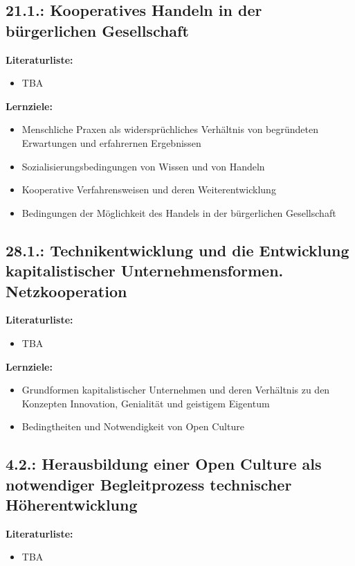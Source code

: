 \documentclass[11pt,a4paper]{article}
\begin{document}
\subsection{21.1.: Kooperatives Handeln in der bürgerlichen Gesellschaft}

\textbf{Literaturliste:}
\begin{itemize}
\item TBA
\end{itemize}

\textbf{Lernziele:}
\begin{itemize}[noitemsep]
\item Menschliche Praxen als widersprüchliches Verhältnis von begründeten
  Erwartungen und erfahrernen Ergebnissen
\item Sozialisierungsbedingungen von Wissen und von Handeln
\item Kooperative Verfahrensweisen und deren Weiterentwicklung
\item Bedingungen der Möglichkeit des Handels in der bürgerlichen Gesellschaft 
\end{itemize}

\subsection{28.1.: Technikentwicklung und die Entwicklung kapitalistischer
  Unternehmensformen. Netzkooperation} 

\textbf{Literaturliste:}
\begin{itemize}
\item TBA
\end{itemize}

\textbf{Lernziele:}
\begin{itemize}[noitemsep]
\item Grundformen kapitalistischer Unternehmen und deren Verhältnis zu den
  Konzepten Innovation, Genialität und geistigem Eigentum
\item Bedingtheiten und Notwendigkeit von Open Culture
\end{itemize}

\subsection{4.2.: Herausbildung einer Open Culture als notwendiger
  Begleitprozess technischer Höherentwicklung} 

\textbf{Literaturliste:}
\begin{itemize}
\item TBA
\end{itemize}
\end{document}
